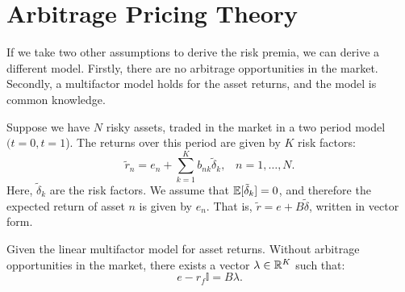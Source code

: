 \documentclass[twoside, titlepage]{article}
\begin{document}
\section{Arbitrage Pricing Theory}

If we take two other assumptions to derive the risk premia, we can derive a different model. Firstly, there are no arbitrage opportunities in the market. Secondly, a multifactor model holds for the asset returns, and the model is common knowledge.

Suppose we have $N$ risky assets, traded in the market in a two period model $(t=0, t=1$). The returns over this period are given by $K$ risk factors:
\[
    \tilde{r}_n = e_n + \sum_{k=1}^{K} b_{nk} \tilde{\delta}_k, \;\;\; n = 1, \dots, N.
\]
Here, $\tilde{\delta}_k$ are the risk factors. We assume that $\mathbb{E}[\tilde{\delta}_k] = 0$, and therefore the expected return of asset $n$ is given by $e_n$. That is, $\tilde{r} = e + B\tilde{\delta}$, written in vector form.

\begin{proposition}[Proposition 5.2] \label{prop:5.2}
    Given the linear multifactor model for asset returns. Without arbitrage opportunities in the market, there exists a vector $\lambda \in \mathbb{R}^K$ such that:
    \[
        e - r_f\mathbb{I} = B\lambda.
    \]
\end{proposition}
\end{document}
